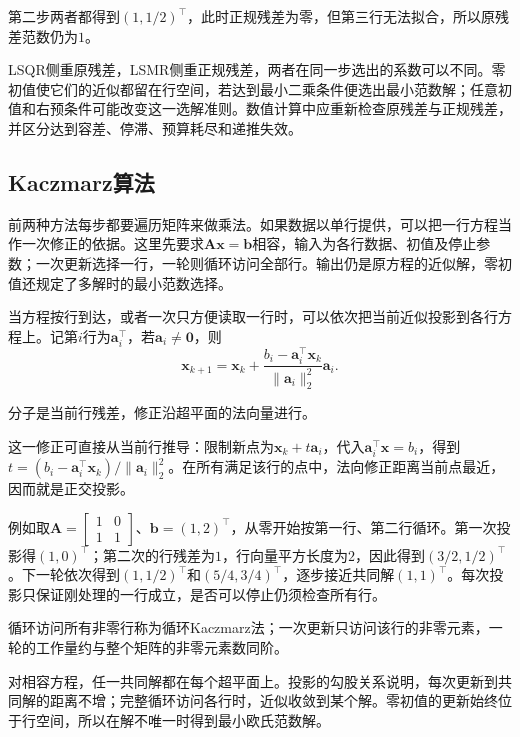 第二步两者都得到$(1,1/2)^\top$，此时正规残差为零，但第三行无法拟合，所以原残差范数仍为$1$。

LSQR侧重原残差，LSMR侧重正规残差，两者在同一步选出的系数可以不同。零初值使它们的近似都留在行空间，若达到最小二乘条件便选出最小范数解；任意初值和右预条件可能改变这一选解准则。数值计算中应重新检查原残差与正规残差，并区分达到容差、停滞、预算耗尽和递推失效。

\subsection{Kaczmarz算法}
\label{sec:ls-kaczmarz}

前两种方法每步都要遍历矩阵来做乘法。如果数据以单行提供，可以把一行方程当作一次修正的依据。这里先要求$\bm A\bm x=\bm b$相容，输入为各行数据、初值及停止参数；一次更新选择一行，一轮则循环访问全部行。输出仍是原方程的近似解，零初值还规定了多解时的最小范数选择。

当方程按行到达，或者一次只方便读取一行时，可以依次把当前近似投影到各行方程上。记第$i$行为$\bm a_i^\top$，若$\bm a_i\ne\bm0$，则
\begin{equation}
 \bm x_{k+1}=\bm x_{k}+
 \frac{b_i-\bm a_i^\top\bm x_{k}}{\lVert\bm a_i\rVert_2^2}\bm a_i.
 \label{eq:ls-kaczmarz-update}
\end{equation}

分子是当前行残差，修正沿超平面的法向量进行。

这一修正可直接从当前行推导：限制新点为$\bm x_k+t\bm a_i$，代入$\bm a_i^\top\bm x=b_i$，得到$t=(b_i-\bm a_i^\top\bm x_k)/\|\bm a_i\|_2^2$。在所有满足该行的点中，法向修正距离当前点最近，因而就是正交投影。

例如取$\bm A=\left[\begin{smallmatrix}1&0\\1&1\end{smallmatrix}\right]$、$\bm b=(1,2)^\top$，从零开始按第一行、第二行循环。第一次投影得$(1,0)^\top$；第二次的行残差为$1$，行向量平方长度为$2$，因此得到$(3/2,1/2)^\top$。下一轮依次得到$(1,1/2)^\top$和$(5/4,3/4)^\top$，逐步接近共同解$(1,1)^\top$。每次投影只保证刚处理的一行成立，是否可以停止仍须检查所有行。

循环访问所有非零行称为循环Kaczmarz法；一次更新只访问该行的非零元素，一轮的工作量约与整个矩阵的非零元素数同阶。

对相容方程，任一共同解都在每个超平面上。投影的勾股关系说明，每次更新到共同解的距离不增；完整循环访问各行时，近似收敛到某个解。零初值的更新始终位于行空间，所以在解不唯一时得到最小欧氏范数解。

